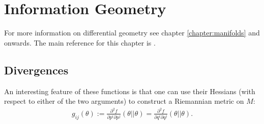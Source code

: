 \chapter{Information Geometry}\label{chapter:info}

    For more information on differential geometry see chapter \ref{chapter:manifolds} and onwards. The main reference for this chapter is \cite{amari}.

\section{Divergences}


    An interesting feature of these functions is that one can use their Hessians (with respect to either of the two arguments) to construct a Riemannian metric on $M$:
    \begin{gather}
        g_{ij}(\theta) := \frac{\partial^2f}{\partial p^i\partial p^j}(\theta||\theta) = \frac{\partial^2f}{\partial q^i\partial q^j}(\theta||\theta).
    \end{gather}

